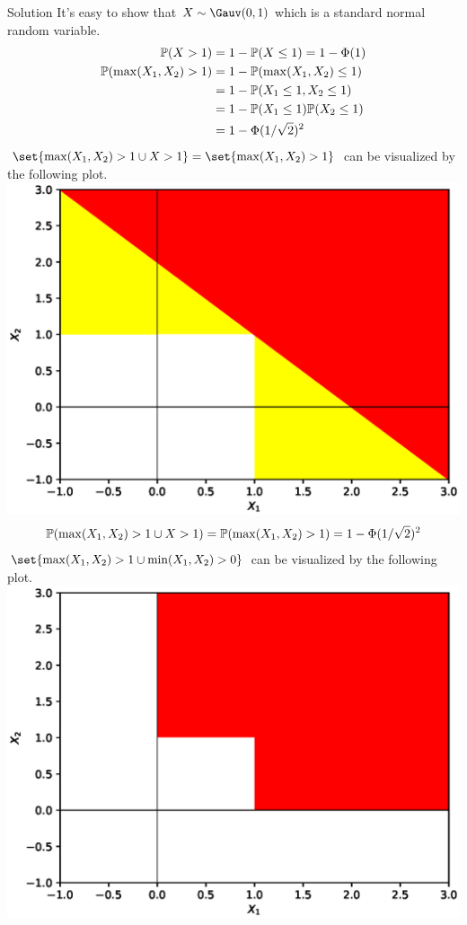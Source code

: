 \documentclass{article}
\begin{document}
\begin{solution}
    {Solution}
    It's easy to show that $X\sim\Gauv(0, 1)$ which is a standard normal random variable.
    \begin{align*}
        \P{X>1}
        &= 1- \P{X\leq 1} = 1-\Phi(1) \\
        \P{\max(X_1,X_2)>1}
        &= 1-\P{\max(X_1,X_2)\leq 1} \\
        &= 1-\P{X_1\leq 1, X_2\leq 1} \\
        &= 1-\P{X_1\leq 1}\P{X_2\leq 1} \\
        &= 1-\Phi(1/\sqrt{2})^2
    \end{align*}
    $\set{\max(X_1,X_2)>1 \cup X>1}=\set{\max(X_1,X_2)>1}$ can be visualized by the following plot.
    \includegraphics[width=\textwidth]{plot1.eps}
    \begin{align*}
        \P{\max(X_1,X_2)>1 \cup X>1}=\P{\max(X_1,X_2)>1} = 1-\Phi(1/\sqrt{2})^2
    \end{align*}
    $\set{\max(X_1,X_2)>1 \cup \min(X_1,X_2)>0}$ can be visualized by the following plot.
    \includegraphics[width=\textwidth]{plot2.eps}

\end{solution}
\end{document}
